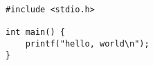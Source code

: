 \documentclass{article}
\begin{document}
\lstset{language=C}

\begin{lstlisting}
#include <stdio.h>

int main() {
    printf("hello, world\n");
}

\end{lstlisting}
\end{document}
